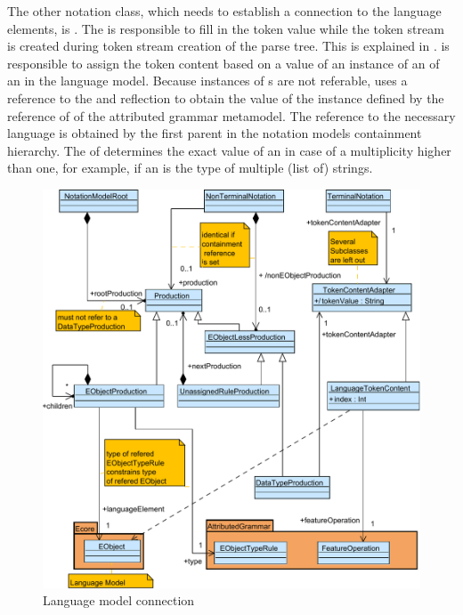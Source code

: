 The other notation class, which needs to establish a connection to the language elements, is . The  is responsible to fill in the token value while the token stream is created during token stream creation of the parse tree. This is explained in .  is responsible to assign the token content based on a value of an instance of an  of an  in the language model. Because instances of s are not referable,  uses a reference to the  and reflection to obtain the value of the  instance defined by the  reference of  of the attributed grammar metamodel. The reference to the necessary language  is obtained by the first parent  in the notation models containment hierarchy. The  of  determines the exact value of an  in case of a multiplicity higher than one, for example, if an  is the type of multiple (list of) strings. 

\begin{figure}
\centering
\includegraphics[scale=0.8]{gfx/ex/Notation_LangRel} 
\caption{Language model connection}
\label{MM:Not:LR}
\end{figure}

